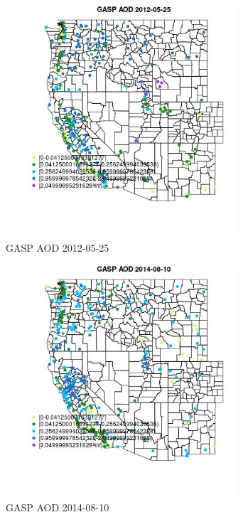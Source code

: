 \begin{figure} 
\centering  
\includegraphics[width=0.77\textwidth]{Code_Outputs/Report_ML_input_PM25_Step4_part_e_de_duplicated_aves_compiled_2019-05-18wNAs_MapObsGASP_AOD2012-05-25.jpg} 
\caption{\label{fig:Report_ML_input_PM25_Step4_part_e_de_duplicated_aves_compiled_2019-05-18wNAsMapObsGASP_AOD2012-05-25}GASP AOD 2012-05-25} 
\end{figure} 
 

\begin{figure} 
\centering  
\includegraphics[width=0.77\textwidth]{Code_Outputs/Report_ML_input_PM25_Step4_part_e_de_duplicated_aves_compiled_2019-05-18wNAs_MapObsGASP_AOD2014-08-10.jpg} 
\caption{\label{fig:Report_ML_input_PM25_Step4_part_e_de_duplicated_aves_compiled_2019-05-18wNAsMapObsGASP_AOD2014-08-10}GASP AOD 2014-08-10} 
\end{figure} 
 

